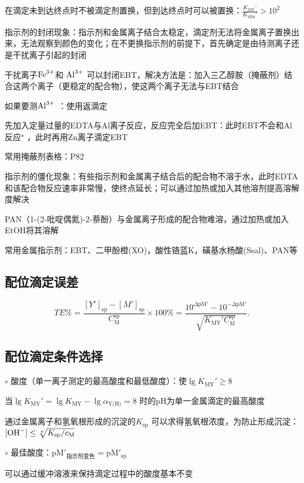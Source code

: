 在滴定未到达终点时不被滴定剂置换，但到达终点时可以被置换：$\frac{K_\text{MY}'}{K_\text{MIn}'}>10^2 $
\begin{notation}
    指示剂的封闭现象：指示剂和金属离子结合太稳定，滴定剂无法将金属离子置换出来，无法观察到颜色的变化；在不更换指示剂的前提下，首先确定是由待测离子还是干扰离子引起的封闭
\end{notation}
\begin{eg}
    干扰离子$\ce{Fe^3+}$和 $\ce{Al^3+}$ 可以封闭EBT，解决方法是：加入三乙醇胺（掩蔽剂）结合这两个离子（更稳定的配合物），使这两个离子无法与EBT结合
\end{eg}
\begin{eg}
    如果要测$\ce{Al^3+}$ ：使用返滴定

    先加入定量过量的EDTA与Al离子反应，反应完全后加EBT：此时EBT不会和Al反应$^\star $ ，此时再用Zn离子滴定EBT
\end{eg}
常用掩蔽剂表格：P82
\begin{notation}
    指示剂的僵化现象：有些指示剂和金属离子结合后的配合物不溶于水，此时EDTA和该配合物反应速率非常慢，使终点延长；可以通过加热或加入其他溶剂提高溶解度解决
\end{notation}
\begin{eg}
    PAN（1-(2-吡啶偶氮)-2-萘酚）与金属离子形成的配合物难溶，通过加热或加入EtOH将其溶解
\end{eg}
常用金属指示剂：EBT、二甲酚橙(XO)，酸性铬蓝K，磺基水杨酸(Ssal)、PAN等
\subsection{配位滴定误差}%
\label{sub:配位滴定误差}
\[
    TE\%=\frac{[Y']_\text{sp}-[M']_\text{sp}}{C_\text{M}^{\text{sp}}}\times 100\%=\frac{10^{\Delta \text{pM}'}-10^{-\Delta \text{pM}'}}{\sqrt{K_\text{MY}'C_\text{M}^{\text{sp}}}}
.\]
\subsection{配位滴定条件选择}%
\label{sub:配位滴定条件选择}
$\circ$ 酸度（单一离子测定的最高酸度和最低酸度）：使$\lg K_\text{MY}'\ge 8$

当$\lg K_\text{MY}'=\lg K_\text{MY}-\lg\alpha_\text{Y(H)}=8$ 时的pH为单一金属滴定的最高酸度

通过金属离子和氢氧根形成的沉淀的$K_\text{sp}$ 可以求得氢氧根浓度，为防止形成沉淀：$[\ce{OH-}]\le \sqrt[a]{K_\text{sp}/c_\text{M}}$

$\circ$ 最佳酸度：$\text{pM}'_\text{指示剂变色}=\text{pM}'_\text{sp}$
\begin{notation}
    可以通过缓冲溶液来保持滴定过程中的酸度基本不变
\end{notation}
